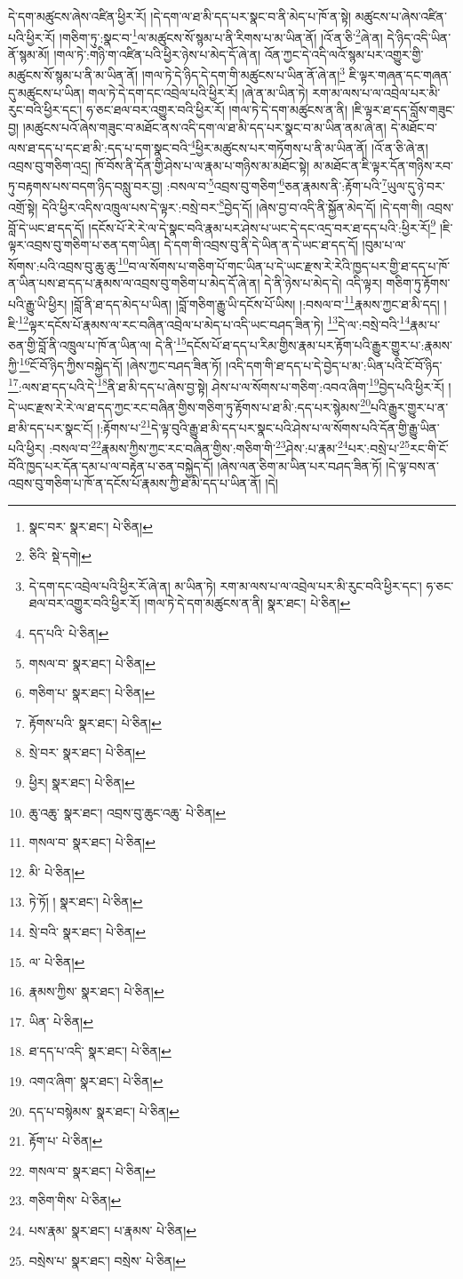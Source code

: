 དེ་དག་མཚུངས་ཞེས་འཛིན་ཕྱིར་རོ། །དེ་དག་ལ་ཐ་མི་དད་པར་སྣང་བ་ནི་མེད་པ་ཁོ་ན་སྟེ། མཚུངས་པ་ཞེས་འཛིན་པའི་ཕྱིར་རོ། །གཅིག་ཏུ་:སྣང་བ་\footnote{སྣང་བར་  སྣར་ཐང་།  པེ་ཅིན། }ལ་མཚུངས་སོ་སྙམ་པ་ནི་རིགས་པ་མ་ཡིན་ནོ། །འོ་ན་ཅི་\footnote{ཅིའི་  སྡེ་དགེ། }ཞེ་ན། དེ་ཉིད་འདི་ཡིན་ནོ་སྙམ་མོ། །གལ་ཏེ་:གཉི་ག་འཛིན་པའི་ཕྱིར་ཉེས་པ་མེད་དོ་ཞེ་ན། འོན་ཀྱང་དེ་འདི་ལའོ་སྙམ་པར་འགྱུར་གྱི་མཚུངས་སོ་སྙམ་པ་ནི་མ་ཡིན་ནོ། །གལ་ཏེ་དེ་ཉིད་དེ་དག་གི་མཚུངས་པ་ཡིན་ནོ་ཞེ་ན།\footnote{དེ་དག་དང་འབྲེལ་པའི་ཕྱིར་རོ་ཞེ་ན། མ་ཡིན་ཏེ། རག་མ་ལས་པ་ལ་འབྲེལ་པར་མི་རུང་བའི་ཕྱིར་དང་། ཧ་ཅང་ཐལ་བར་འགྱུར་བའི་ཕྱིར་རོ། །གལ་ཏེ་དེ་དག་མཚུངས་ན་ནི།  སྣར་ཐང་།  པེ་ཅིན། } ཇི་ལྟར་གཞན་དང་གཞན་དུ་མཚུངས་པ་ཡིན། གལ་ཏེ་དེ་དག་དང་འབྲེལ་པའི་ཕྱིར་རོ། །ཞེ་ན་མ་ཡིན་ཏེ། རག་མ་ལས་པ་ལ་འབྲེལ་པར་མི་རུང་བའི་ཕྱིར་དང་། ཧ་ཅང་ཐལ་བར་འགྱུར་བའི་ཕྱིར་རོ། །གལ་ཏེ་དེ་དག་མཚུངས་ན་ནི། །ཇི་ལྟར་ཐ་དད་བློས་གཟུང་བྱ། །མཚུངས་པའོ་ཞེས་གཟུང་བ་མཐོང་ནས་འདི་དག་ལ་ཐ་མི་དད་པར་སྣང་བ་མ་ཡིན་ནམ་ཞེ་ན། དེ་མཐོང་བ་ལས་ཐ་དད་པ་དང་ཐ་མི་:དད་པ་དག་སྣང་བའི་\footnote{དད་པའི་  པེ་ཅིན། }ཕྱིར་མཚུངས་པར་གཏོགས་པ་ནི་མ་ཡིན་ནོ། །འོ་ན་ཅི་ཞེ་ན། འབྲས་བུ་གཅིག་འདྲ། ཁོ་བོས་ནི་དོན་གྱི་ཤེས་པ་ལ་རྣམ་པ་གཉིས་མ་མཐོང་སྟེ། མ་མཐོང་ན་ཇི་ལྟར་དོན་གཉིས་རབ་ཏུ་བརྟགས་པས་བདག་ཉིད་བསླུ་བར་བྱ། :བསལ་བ་\footnote{གསལ་བ་  སྣར་ཐང་།  པེ་ཅིན། }འབྲས་བུ་གཅིག་\footnote{གཅིག་པ་  སྣར་ཐང་།  པེ་ཅིན། }ཅན་རྣམས་ནི་:རྟོག་པའི་\footnote{རྟོགས་པའི་  སྣར་ཐང་།  པེ་ཅིན། }ཡུལ་དུ་ཉེ་བར་འགྲོ་སྟེ། དེའི་ཕྱིར་འདིས་འཁྲུལ་པས་དེ་ལྟར་:བསྲེ་བར་\footnote{སྲེ་བར་  སྣར་ཐང་།  པེ་ཅིན། }བྱེད་དོ། །ཞེས་བྱ་བ་འདི་ནི་སྐྱོན་མེད་དོ། །དེ་དག་གི། འབྲས་བློ་དེ་ཡང་ཐ་དད་དོ། །དངོས་པོ་རེ་རེ་ལ་དེ་སྣང་བའི་རྣམ་པར་ཤེས་པ་ཡང་དེ་དང་འདྲ་བར་ཐ་དད་པའི་:ཕྱིར་རོ།\footnote{ཕྱིར།  སྣར་ཐང་།  པེ་ཅིན། } །ཇི་ལྟར་འབྲས་བུ་གཅིག་པ་ཅན་དག་ཡིན། དེ་དག་གི་འབྲས་བུ་ནི་དེ་ཡིན་ན་དེ་ཡང་ཐ་དད་དོ། །བུམ་པ་ལ་སོགས་:པའི་འབྲས་བུ་ཆུ་ཆུ་\footnote{ཆུ་འཆུ་  སྣར་ཐང་། འབྲས་བུ་ཆུང་འཆུ་  པེ་ཅིན། }བ་ལ་སོགས་པ་གཅིག་པོ་གང་ཡིན་པ་དེ་ཡང་རྫས་རེ་རེའི་ཁྱད་པར་གྱི་ཐ་དད་པ་ཁོ་ན་ཡིན་པས་ཐ་དད་པ་རྣམས་ལ་འབྲས་བུ་གཅིག་པ་མེད་དོ་ཞེ་ན། དེ་ནི་ཉེས་པ་མེད་དེ། འདི་ལྟར། གཅིག་ཏུ་རྟོགས་པའི་རྒྱུ་ཡི་ཕྱིར། །བློ་ནི་ཐ་དད་མེད་པ་ཡིན། །བློ་གཅིག་རྒྱུ་ཡི་དངོས་པོ་ཡིས། །:བསལ་བ་\footnote{གསལ་བ་  སྣར་ཐང་།  པེ་ཅིན། }རྣམས་ཀྱང་ཐ་མི་དད། །ཇི་\footnote{མི་  པེ་ཅིན། }ལྟར་དངོས་པོ་རྣམས་ལ་རང་བཞིན་འབྲེལ་པ་མེད་པ་འདི་ཡང་བཤད་ཟིན་ཏེ། \footnote{ཏེ་ཏོ། །   སྣར་ཐང་།  པེ་ཅིན། }དེ་ལ་:བསྲེ་བའི་\footnote{སྲེ་བའི་  སྣར་ཐང་།  པེ་ཅིན། }རྣམ་པ་ཅན་གྱི་བློ་ནི་འཁྲུལ་པ་ཁོ་ན་ཡིན་ལ། དེ་ནི་\footnote{ལ་  པེ་ཅིན། }དངོས་པོ་ཐ་དད་པ་རིམ་གྱིས་རྣམ་པར་རྟོག་པའི་རྒྱུར་གྱུར་པ་:རྣམས་ཀྱི་\footnote{རྣམས་ཀྱིས་  སྣར་ཐང་།  པེ་ཅིན། }ངོ་བོ་ཉིད་ཀྱིས་བསྐྱེད་དོ། །ཞེས་ཀྱང་བཤད་ཟིན་ཏོ། །འདི་དག་གི་ཐ་དད་པ་དེ་བྱེད་པ་མ་:ཡིན་པའི་ངོ་བོ་ཉིད་\footnote{ཡིན་  པེ་ཅིན། }:ལས་ཐ་དད་པའི་དེ་\footnote{ཐ་དད་པ་འདི་  སྣར་ཐང་།  པེ་ཅིན། }ནི་ཐ་མི་དད་པ་ཞེས་བྱ་སྟེ། ཤེས་པ་ལ་སོགས་པ་གཅིག་:འབའ་ཞིག་\footnote{འགའ་ཞིག་  སྣར་ཐང་།  པེ་ཅིན། }བྱེད་པའི་ཕྱིར་རོ། །དེ་ཡང་རྫས་རེ་རེ་ལ་ཐ་དད་ཀྱང་རང་བཞིན་གྱིས་གཅིག་ཏུ་རྟོགས་པ་ཐ་མི་:དད་པར་སྙེམས་\footnote{དད་པ་བསྙེམས་  སྣར་ཐང་།  པེ་ཅིན། }པའི་རྒྱུར་གྱུར་པ་ན་ཐ་མི་དད་པར་སྣང་ངོ། །:རྟོགས་པ་\footnote{རྟོག་པ་  པེ་ཅིན། }དེ་ལྟ་བུའི་རྒྱུ་ཐ་མི་དད་པར་སྣང་པའི་ཤེས་པ་ལ་སོགས་པའི་དོན་གྱི་རྒྱུ་ཡིན་པའི་ཕྱིར། :བསལ་བ་\footnote{གསལ་བ་  སྣར་ཐང་།  པེ་ཅིན། }རྣམས་ཀྱིས་ཀྱང་རང་བཞིན་གྱིས་:གཅིག་གི་\footnote{གཅིག་གིས་  པེ་ཅིན། }ཤེས་:པ་རྣམ་\footnote{པས་རྣམ་  སྣར་ཐང་། པ་རྣམས་  པེ་ཅིན། }པར་:བསྲེ་པ་\footnote{བསྲེས་པ་  སྣར་ཐང་། བསྲེས་  པེ་ཅིན། }རང་གི་ངོ་བོའི་ཁྱད་པར་དོན་དམ་པ་ལ་བརྟེན་པ་ཅན་བསྐྱེད་དོ། །ཞེས་ལན་ཅིག་མ་ཡིན་པར་བཤད་ཟིན་ཏོ། །དེ་ལྟ་བས་ན་འབྲས་བུ་གཅིག་པ་ཁོ་ན་དངོས་པོ་རྣམས་ཀྱི་ཐ་མི་དད་པ་ཡིན་ནོ། །དེ། 